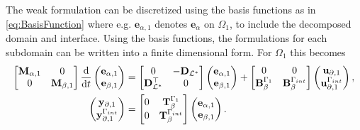 \documentclass[11pt,a4paper]{article}
\begin{document}
The weak formulation can be discretized using the basis functions as in \eqref{eq:BasisFunction} where e.g. $\bm{e}_{\alpha,1}$ denotes $\bm{e}_\alpha$ on $\Omega_1$, to include the decomposed domain and interface. Using the basis functions, the formulations for each subdomain can be written into a finite dimensional form. For $\Omega_1$ this becomes
\begin{equation}
    \begin{aligned}
        \begin{bmatrix}
            \mathbf{M}_{\alpha,1} & 0 \\
            0 & \mathbf{M}_{\beta,1}
        \end{bmatrix}
        \odv{}{t}
        \begin{pmatrix}
            \mathbf{e}_{\alpha,1} \\
            \mathbf{e}_{\beta,1}
        \end{pmatrix} &= 
        \begin{bmatrix}
            0 & -\mathbf{D}_{\mathcal{L}^*} \\
            \mathbf{D}_{\mathcal{L}^*}^\top & 0 
        \end{bmatrix}
        \begin{pmatrix}
            \mathbf{e}_{\alpha,1} \\
            \mathbf{e}_{\beta,1}
        \end{pmatrix} + 
        \begin{bmatrix}
            0 & 0 \\
            \mathbf{B}_{\beta}^{\Gamma_1} & \mathbf{B}_{\beta}^{\Gamma_{\rm int}}
        \end{bmatrix}
        \begin{pmatrix}
            \mathbf{u}_{\partial,1} \\
            \mathbf{u}_{\partial,1}^{\Gamma_{\rm int}}
        \end{pmatrix}, \\
        \begin{pmatrix}
            \mathbf{y}_{\partial,1} \\
            \mathbf{y}_{\partial,1}^{\Gamma_{\rm int}}
        \end{pmatrix} &= 
        \begin{bmatrix}
            0 & \mathbf{T}_{\beta}^{\Gamma_1} \\
            0 & \mathbf{T}_{\beta}^{\Gamma_{\rm int}}
        \end{bmatrix}
        \begin{pmatrix}
            \mathbf{e}_{\alpha, 1} \\
            \mathbf{e}_{\beta, 1}
        \end{pmatrix}.
    \end{aligned}
\label{eq:pH-system-L*}
\end{equation}
\end{document}
